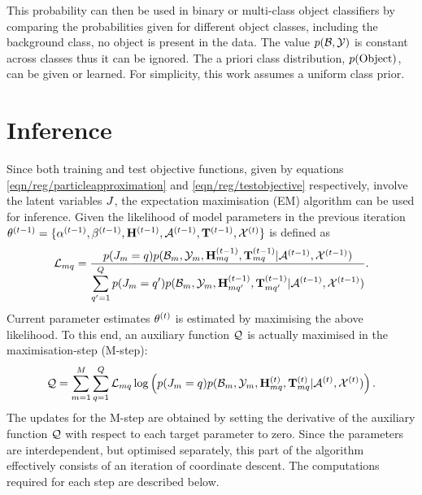 This probability can then be used in binary or multi-class object classifiers by comparing the probabilities given for different object classes, including the background class, \ie no object is present in the data. The value $p(\mathcal{B},\mathcal{Y})$ is constant across classes thus it can be ignored. The a priori class distribution, $p(\mathrm{Object})$, can be given or learned. For simplicity, this work assumes a uniform class prior. 

\section{Inference}
\label{sec/reg/optimisation}

Since both training and test objective functions, given by equations \ref{eqn/reg/particleapproximation} and \ref{eqn/reg/testobjective} respectively, involve the latent variables ${J}$, the expectation maximisation (EM) algorithm can be used for inference. 
Given the likelihood of model parameters in the previous iteration $\theta^{(t-1)} = \{{\alpha}^{(t-1)},{\beta}^{(t-1)},\mathbf{H}^{(t-1)},\mathcal{A}^{(t-1)},\mathbf{T}^{(t-1)},\mathcal{X}^{(t)}\}$ is defined as
\begin{equation}
	\mathcal{L}_{mq} = \frac{p({J}_{m} = q)p(\mathcal{B}_m,\mathcal{Y}_m,\mathbf{H}^{(t-1)}_{mq},\mathbf{T}^{(t-1)}_{mq}|\mathcal{A}^{(t-1)},\mathcal{X}^{(t-1)})}{\displaystyle\sum_{q' = 1}^{Q} p({J}_{m}  =  q')p(\mathcal{B}_m,\mathcal{Y}_m,\mathbf{H}^{(t-1)}_{mq'},\mathbf{T}^{(t-1)}_{mq'}|\mathcal{A}^{(t-1)},\mathcal{X}^{(t-1)})}.
\end{equation}
Current parameter estimates $\theta^{(t)}$ is estimated by maximising the above likelihood. To this end, an auxiliary function $\mathcal{Q}$ is actually maximised in the maximisation-step (M-step):  
\begin{equation}
	\mathcal{Q} = \displaystyle\sum_{m=1}^M \displaystyle\sum_{q = 1}^{Q} \mathcal{L}_{mq} \log \left( p({J}_{m} = q)p(\mathcal{B}_m,\mathcal{Y}_m,\mathbf{H}^{(t)}_{mq},\mathbf{T}^{(t)}_{mq}|\mathcal{A}^{(t)},\mathcal{X}^{(t)}) \right).
	\label{eqn/reg/auxiliary}
\end{equation}
The updates for the M-step are obtained by setting the derivative of the auxiliary function $\mathcal{Q}$ with respect to each target parameter to zero. Since the parameters are interdependent, but optimised separately, this part of the algorithm effectively consists of an iteration of coordinate descent. The computations required for each step are described below.

